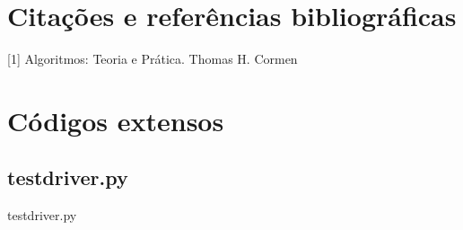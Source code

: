 \documentclass[12pt,a4paper,twoside]{report}
\begin{document}
\chapter{Citações e referências bibliográficas}
	[1] Algoritmos: Teoria e Prática. Thomas H. Cormen
		\date{Today}






\clearpage
{}
\appendix

\chapter{Códigos extensos \label{ap:testdriver}}
\section{testdriver.py}
 {testdriver.py}
\end{document}
